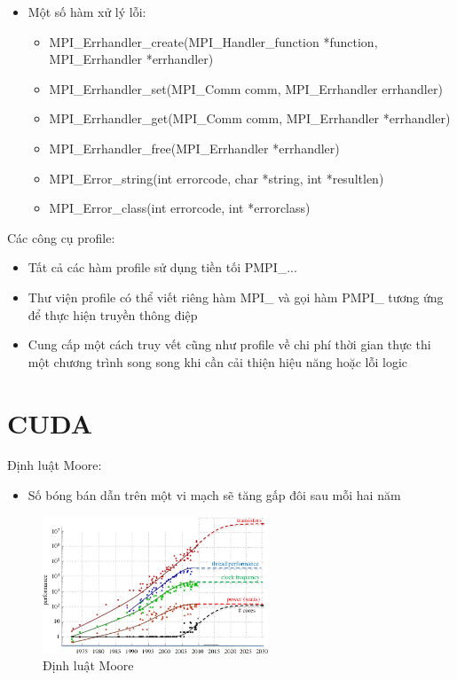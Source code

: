 \documentclass[14pt, a4paper]{article}
\numberwithin{equation}{section}
\numberwithin{figure}{section}
\numberwithin{dl}{section}
\numberwithin{md}{section}
\numberwithin{bd}{section}
\numberwithin{dn}{section}
\numberwithin{hq}{section}
\begin{document}
\begin{itemize}
    \item Một số hàm xử lý lỗi:
    \begin{itemize}
        \item MPI\_Errhandler\_create(MPI\_Handler\_function *function,
                                      MPI\_Errhandler *errhandler) 
        \item MPI\_Errhandler\_set(MPI\_Comm comm, MPI\_Errhandler errhandler) 
        \item MPI\_Errhandler\_get(MPI\_Comm comm, MPI\_Errhandler *errhandler)
        \item MPI\_Errhandler\_free(MPI\_Errhandler *errhandler)
        \item MPI\_Error\_string(int errorcode, char *string, int *resultlen)
        \item MPI\_Error\_class(int errorcode, int *errorclass)
    \end{itemize}
\end{itemize}

Các công cụ profile:

\begin{itemize}
    \item Tất cả các hàm profile sử dụng tiền tối PMPI\_... 
    \item Thư viện profile có thể viết riêng hàm MPI\_ và gọi hàm PMPI\_ tương ứng để thực hiện truyền thông điệp
    \item Cung cấp một cách truy vết cũng như profile về chi phí thời gian thực thi một chương trình song song khi cần cải thiện hiệu năng hoặc lỗi logic
\end{itemize}

\section{CUDA}

Định luật Moore:

\begin{itemize}
    \item Số bóng bán dẫn trên một vi mạch sẽ tăng gấp đôi sau mỗi hai năm
\end{itemize}
\begin{figure}[H]
    \centering
    \includegraphics[width=0.6\textwidth]{figures/CUDA/Moore_Law.png}
    \caption{Định luật Moore}
\end{figure}
\end{document}
